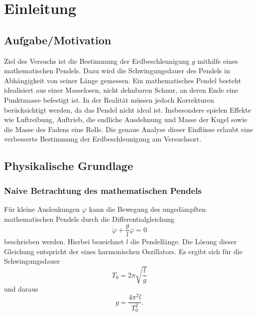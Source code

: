 \chapter{Einleitung}

\section{Aufgabe/Motivation}
Ziel des Versuchs ist die Bestimmung der Erdbeschleunigung $g$ mithilfe eines mathematischen Pendels. Dazu wird die Schwingungsdauer des Pendels in Abhängigkeit von seiner Länge gemessen. Ein mathematisches Pendel besteht idealisiert aus einer Masselosen, nicht dehnbaren Schnur, an deren Ende eine Punktmasse befestigt ist. In der Realität müssen jedoch Korrekturen berücksichtigt werden, da das Pendel nicht ideal ist. Insbesondere spielen Effekte wie Luftreibung, Auftrieb, die endliche Ausdehnung und Masse der Kugel sowie die Masse des Fadens eine Rolle. Die genaue Analyse dieser Einflüsse erlaubt eine verbesserte Bestimmung der Erdbeschleunigung am Versuchsort.

\section{Physikalische Grundlage}
\cite{skript25,demtroeder17}
\subsection{Naive Betrachtung des mathematischen Pendels}
Für kleine Auslenkungen $\varphi$ kann die Bewegung des ungedämpften mathematischen Pendels durch die Differentialgleichung
\begin{equation}
    \ddot{\varphi} + \frac{g}{l} \varphi = 0
    \label{eq:diff_naiv}
\end{equation}
beschrieben werden. Hierbei bezeichnet $l$ die Pendellänge. Die Lösung dieser Gleichung entspricht der eines harmonischen Oszillators. Es ergibt sich für die Schwingungsdauer
\begin{equation}
    T_0 = 2\pi \sqrt{\frac{l}{g}}
    \label{eq:T0}
\end{equation}
und daraus
\begin{equation}
    g = \frac{4\pi^2 l}{T_0^2}.
    \label{eq:g_ideal}
\end{equation}

